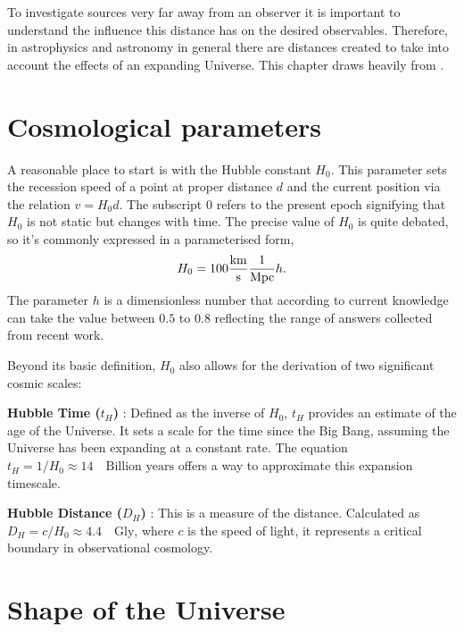 To investigate sources very far away from an observer it is important to understand the influence this distance 
has on the desired observables. Therefore, in astrophysics and astronomy in general there are distances created to take into account the effects of an expanding Universe. 
This chapter draws heavily from \cite{hogg2000distance}. 


\section{Cosmological parameters}

A reasonable place to start is with the Hubble constant $H_0$. 
This parameter sets the recession speed of a point at proper distance $d$ and the current position via the relation $v = H_0 d$. 
The subscript $0$ refers to the present epoch signifying that $H_0$ is not static but changes with time. 
The precise value of $H_0$ is quite debated, so it's commonly expressed in a parameterised form,
$$
H_0= 100\frac{\rm km}{\rm s}\frac{1}{\rm Mpc} h.
$$
The parameter $h$ is a dimensionless number that according to current knowledge can take the value between $0.5$ to $0.8$ reflecting the range of answers collected from recent work. 

Beyond its basic definition, $H_0$ also allows for the derivation of two significant cosmic scales:

\textbf{Hubble Time ($t_H$) }: Defined as the inverse of 
$H_0$, $t_H$ provides an estimate of the age of the Universe. 
It sets a scale for the time since the Big Bang, assuming the Universe has been expanding at a constant rate. The equation 
$t_H = 1/H_0 \approx 14 \quad\text{Billion years}$ offers a way to approximate this expansion timescale.


\textbf{Hubble Distance ($D_H$) }: This is a measure of the distance. Calculated as 
$D_H = c/H_0 \approx 4.4 \quad \text{Gly}$, where $c$ is the speed of light, 
it represents a critical boundary in observational cosmology. %

\section{Shape of the Universe}


